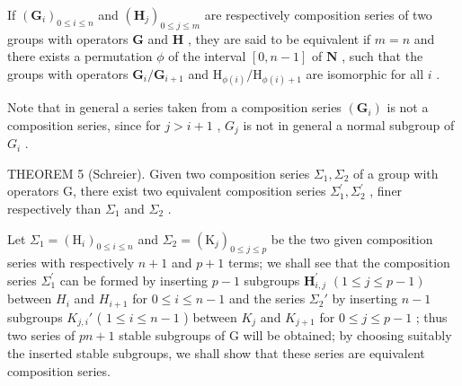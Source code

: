If \((\mathbf{G}_i)_{0\leqslant i\leqslant n}\) and \((\mathbf{H}_j)_{0\leqslant j\leqslant m}\) are respectively composition series of two groups with operators \(\mathbf{G}\) and \(\mathbf{H}\) , they are said to be equivalent if \(m = n\) and there exists a permutation \(\phi\) of the interval \([0,n - 1]\) of \(\mathbf{N}\) , such that the groups with operators \(\mathbf{G}_i / \mathbf{G}_{i + 1}\) and \(\mathrm{H}_{\phi (i)} / \mathrm{H}_{\phi (i) + 1}\) are isomorphic for all \(i\) .

Note that in general a series taken from a composition series \((\mathbf{G}_{i})\) is not a composition series, since for \(j > i + 1\) , \(G_{j}\) is not in general a normal subgroup of \(G_{i}\) .

THEOREM 5 (Schreier). Given two composition series \(\Sigma_{1}, \Sigma_{2}\) of a group with operators G, there exist two equivalent composition series \(\Sigma_{1}^{\prime}, \Sigma_{2}^{\prime}\) , finer respectively than \(\Sigma_{1}\) and \(\Sigma_{2}\) .

Let \(\Sigma_{1} = (\mathrm{H}_{i})_{0\leqslant i\leqslant n}\) and \(\Sigma_{2} = (\mathrm{K}_{j})_{0\leqslant j\leqslant p}\) be the two given composition series with respectively \(n + 1\) and \(p + 1\) terms; we shall see that the composition series \(\Sigma_1^\prime\) can be formed by inserting \(p - 1\) subgroups \(\mathbf{H}_{i,j}^{\prime}\) \((1 \leqslant j \leqslant p - 1)\) between \(H_{i}\) and \(H_{i+1}\) for \(0 \leqslant i \leqslant n - 1\) and the series \(\Sigma_{2}'\) by inserting \(n - 1\) subgroups \(K_{j,i}'\) ( \(1 \leqslant i \leqslant n - 1\) ) between \(K_{j}\) and \(K_{j+1}\) for \(0 \leqslant j \leqslant p - 1\) ; thus two series of \(pn + 1\) stable subgroups of G will be obtained; by choosing suitably the inserted stable subgroups, we shall show that these series are equivalent composition series.

